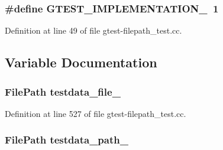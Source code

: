 \subsubsection[{\texorpdfstring{G\+T\+E\+S\+T\+\_\+\+I\+M\+P\+L\+E\+M\+E\+N\+T\+A\+T\+I\+O\+N\+\_\+}{GTEST_IMPLEMENTATION_}}]{\setlength{\rightskip}{0pt plus 5cm}\#define G\+T\+E\+S\+T\+\_\+\+I\+M\+P\+L\+E\+M\+E\+N\+T\+A\+T\+I\+O\+N\+\_\+~1}\hypertarget{gtest-filepath__test_8cc_a83bd232fd1077579fada92c31bb7469f}{}\label{gtest-filepath__test_8cc_a83bd232fd1077579fada92c31bb7469f}


Definition at line 49 of file gtest-\/filepath\+\_\+test.\+cc.



\subsection{Variable Documentation}
\subsubsection[{\texorpdfstring{testdata\+\_\+file\+\_\+}{testdata_file_}}]{\setlength{\rightskip}{0pt plus 5cm}File\+Path testdata\+\_\+file\+\_\+\hspace{0.3cm}{\ttfamily [protected]}}\hypertarget{gtest-filepath__test_8cc_ab25205b360de0f1648175ccbc1cc4365}{}\label{gtest-filepath__test_8cc_ab25205b360de0f1648175ccbc1cc4365}


Definition at line 527 of file gtest-\/filepath\+\_\+test.\+cc.

\subsubsection[{\texorpdfstring{testdata\+\_\+path\+\_\+}{testdata_path_}}]{\setlength{\rightskip}{0pt plus 5cm}File\+Path testdata\+\_\+path\+\_\+\hspace{0.3cm}{\ttfamily [protected]}}\hypertarget{gtest-filepath__test_8cc_aed9839d60eafc7d5afbf14281a31caea}{}\label{gtest-filepath__test_8cc_aed9839d60eafc7d5afbf14281a31caea}


